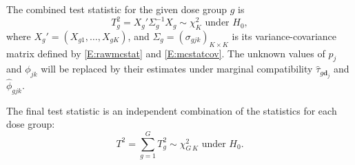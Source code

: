 \documentclass[reqno]{amsart}
\newcommand{\dvec}{\mathbf{d}}
\begin{document}
The combined test statistic for the given dose group $g$ is
\begin{equation}
T^2_g = X_g' \Sigma_g^{-1} X_g \sim \chi^2_K \text{ under }H_0,
\end{equation}
where $X_g' =  (X_{g1}, \ldots, X_{gK})$, and $\Sigma_g=(\sigma_{gjk})_{K\times K}$ is its variance-covariance matrix defined by
\eqref{E:rawmcstat} and \eqref{E:mcstatcov}.
The unknown values of $p_j$ and $\phi_{jk}$ will be replaced by their estimates under marginal compatibility
$\hat{\tau}_{g\dvec_j}$ and $\hat{\phi}_{gjk}$.

The final test statistic is an independent combination of the statistics for each dose group:
\begin{equation}
T^2=\sum_{g=1}^G T_g^2 \sim \chi^2_{G\,K} \text{ under }H_0.
\end{equation}
\end{document}
